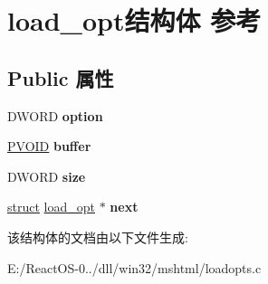 \hypertarget{structload__opt}{}\section{load\+\_\+opt结构体 参考}
\label{structload__opt}
\subsection*{Public 属性}
\begin{DoxyCompactItemize}
\item 
\mbox{\label{structload__opt_a970e459a5fe00dd5cdb67520fa95c52c}} 
D\+W\+O\+RD {\bfseries option}
\item 
\mbox{\label{structload__opt_af665c4e7c003b8c5fe96e982afb196e1}} 
\hyperlink{interfacevoid}{P\+V\+O\+ID} {\bfseries buffer}
\item 
\mbox{\label{structload__opt_a4a4c4037729dbbb13c09f6b0077b4d37}} 
D\+W\+O\+RD {\bfseries size}
\item 
\mbox{\label{structload__opt_aa98ed9e44e7dca2fd5999de296373d5a}} 
\hyperlink{interfacestruct}{struct} \hyperlink{structload__opt}{load\+\_\+opt} $\ast$ {\bfseries next}
\end{DoxyCompactItemize}


该结构体的文档由以下文件生成\+:\begin{DoxyCompactItemize}
\item 
E\+:/\+React\+O\+S-\/0../dll/win32/mshtml/loadopts.\+c\end{DoxyCompactItemize}
